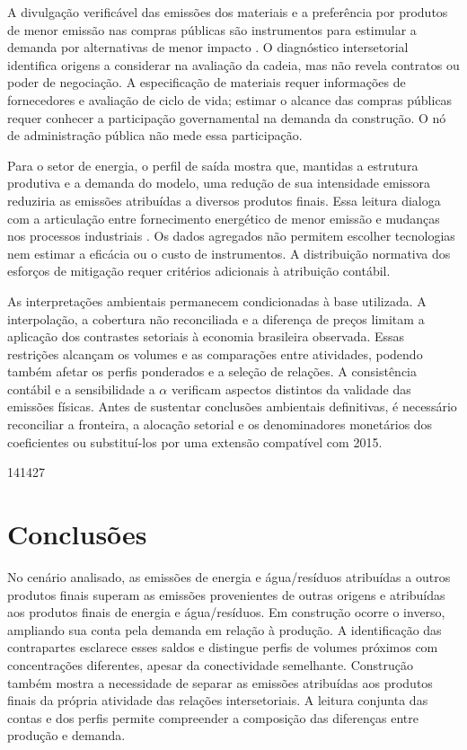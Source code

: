 \documentclass[11pt]{article}
\begin{document}
A divulgação verificável das emissões dos materiais e a preferência por produtos de menor emissão nas compras públicas são instrumentos para estimular a demanda por alternativas de menor impacto \parencite[seções~6.6 e~6.7]{rissman2020}. O diagnóstico intersetorial identifica origens a considerar na avaliação da cadeia, mas não revela contratos ou poder de negociação. A especificação de materiais requer informações de fornecedores e avaliação de ciclo de vida; estimar o alcance das compras públicas requer conhecer a participação governamental na demanda da construção. O nó de administração pública não mede essa participação.

Para o setor de energia, o perfil de saída mostra que, mantidas a estrutura produtiva e a demanda do modelo, uma redução de sua intensidade emissora reduziria as emissões atribuídas a diversos produtos finais. Essa leitura dialoga com a articulação entre fornecimento energético de menor emissão e mudanças nos processos industriais \parencite[seções~4.2 e~7.2]{rissman2020}. Os dados agregados não permitem escolher tecnologias nem estimar a eficácia ou o custo de instrumentos. A distribuição normativa dos esforços de mitigação requer critérios adicionais à atribuição contábil.

As interpretações ambientais permanecem condicionadas à base utilizada. A interpolação, a cobertura não reconciliada e a diferença de preços limitam a aplicação dos contrastes setoriais à economia brasileira observada. Essas restrições alcançam os volumes e as comparações entre atividades, podendo também afetar os perfis ponderados e a seleção de relações. A consistência contábil e a sensibilidade a $\alpha$ verificam aspectos distintos da validade das emissões físicas. Antes de sustentar conclusões ambientais definitivas, é necessário reconciliar a fronteira, a alocação setorial e os denominadores monetários dos coeficientes ou substituí-los por uma extensão compatível com 2015.


141427\section{Conclusões}

No cenário analisado, as emissões de energia e água/resíduos atribuídas a outros produtos finais superam as emissões provenientes de outras origens e atribuídas aos produtos finais de energia e água/resíduos. Em construção ocorre o inverso, ampliando sua conta pela demanda em relação à produção. A identificação das contrapartes esclarece esses saldos e distingue perfis de volumes próximos com concentrações diferentes, apesar da conectividade semelhante. Construção também mostra a necessidade de separar as emissões atribuídas aos produtos finais da própria atividade das relações intersetoriais. A leitura conjunta das contas e dos perfis permite compreender a composição das diferenças entre produção e demanda.
\end{document}
